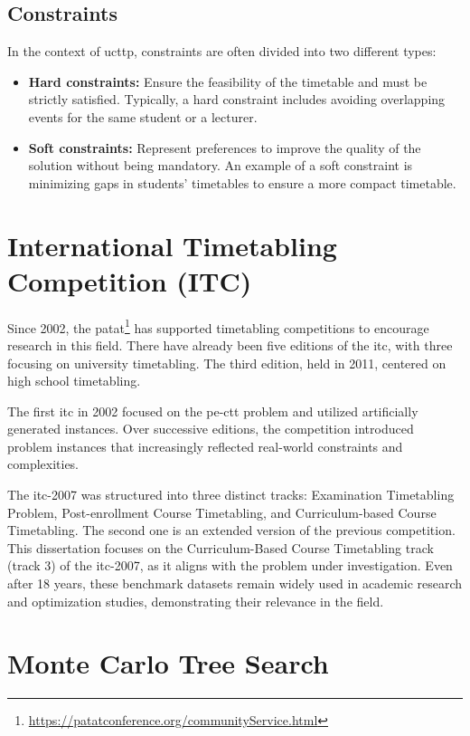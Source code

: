 \subsection{Constraints}
In the context of \ac{ucttp}, constraints are often divided into two different types:
\begin{itemize}
\item \textbf{Hard constraints:} Ensure the feasibility of the timetable and must be strictly satisfied. Typically, a hard constraint includes avoiding overlapping events for the same student or a lecturer. 
\item \textbf{Soft constraints:} Represent preferences to improve the quality of the solution without being mandatory. An example of a soft constraint is minimizing gaps in students' timetables to ensure a more compact timetable.
\end{itemize}

\section{International Timetabling Competition (ITC)}

Since 2002, the \ac{patat}\footnote{\url{https://patatconference.org/communityService.html}} has supported timetabling competitions to encourage research in this field. There have already been five editions of the \ac{itc}, with three focusing on university timetabling. The third edition, held in 2011, centered on high school timetabling.

The first \ac{itc} in 2002 focused on the \ac{pe-ctt} problem and utilized artificially generated instances. Over successive editions, the competition introduced problem instances that increasingly reflected real-world constraints and complexities.

The \ac{itc-2007} was structured into three distinct tracks: Examination Timetabling Problem, Post-enrollment Course Timetabling, and Curriculum-based Course Timetabling. The second one is an extended version of the previous competition. This dissertation focuses on the Curriculum-Based Course Timetabling track (track 3) of the \ac{itc-2007}, as it aligns with the problem under investigation. Even after 18 years, these benchmark datasets remain widely used in academic research and optimization studies, demonstrating their relevance in the field.

\section{Monte Carlo Tree Search}

